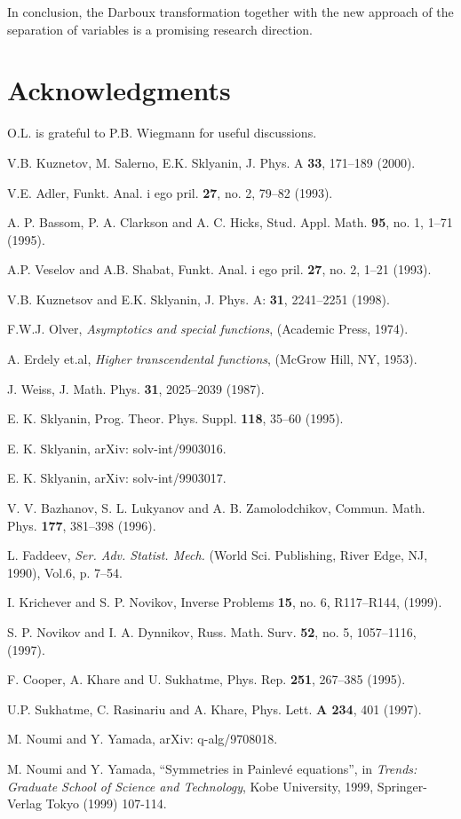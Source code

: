 \documentclass[a4paper,11pt]{article}
\begin{document}
In conclusion, the Darboux transformation together with the new approach of
the separation of variables is a promising research direction.

\section*{Acknowledgments}
\noindent
O.L. is grateful to P.B. Wiegmann for useful discussions.


\begin{thebibliography}{99}

V.B. Kuznetov, M. Salerno, E.K. Sklyanin,
    J. Phys. A {\bf 33}, 171--189 (2000).

V.E. Adler,
    Funkt. Anal. i ego pril. {\bf 27}, no. 2, 79--82 (1993).

A. P. Bassom, P. A. Clarkson and A. C. Hicks,
    Stud. Appl. Math. {\bf 95}, no. 1, 1--71 (1995).

A.P. Veselov and A.B. Shabat,
    Funkt. Anal. i ego pril. {\bf 27}, no. 2, 1--21 (1993).

V.B. Kuznetsov and E.K. Sklyanin,
    J. Phys. A: {\bf 31}, 2241--2251 (1998).

F.W.J. Olver,
    {\it Asymptotics and special functions}, (Academic Press, 1974).

A. Erdely et.al,
    {\it Higher transcendental functions}, (McGrow Hill, NY, 1953).

J. Weiss,
    J. Math. Phys. {\bf 31}, 2025--2039 (1987).

E. K. Sklyanin,
    Prog. Theor. Phys. Suppl. {\bf 118}, 35--60 (1995).

E. K. Sklyanin, arXiv: solv-int/9903016.

E. K. Sklyanin, arXiv: solv-int/9903017.

V. V. Bazhanov, S. L. Lukyanov and A. B. Zamolodchikov,
    Commun. Math. Phys. {\bf 177}, 381--398 (1996).

L. Faddeev,
    {\it Ser. Adv. Statist. Mech. } (World Sci. Publishing, River Edge, NJ, 1990),
    Vol.6, p. 7--54.

I. Krichever and S. P.  Novikov,
    Inverse Problems {\bf 15}, no. 6, R117--R144, (1999).

S. P. Novikov and I. A.  Dynnikov,
    Russ. Math. Surv. {\bf 52}, no. 5, 1057--1116, (1997).

F. Cooper, A. Khare and U. Sukhatme,
    Phys. Rep. {\bf 251}, 267--385 (1995).

U.P. Sukhatme, C. Rasinariu and A. Khare,
    Phys. Lett. {\bf A 234}, 401 (1997).

M. Noumi and Y. Yamada, arXiv: q-alg/9708018.

M. Noumi and Y. Yamada, ``Symmetries in Painlev\'{e} equations'', in
{\em Trends: Graduate School of Science and Technology}, Kobe University, 1999,
Springer-Verlag Tokyo (1999) 107-114.

\end{thebibliography}
\end{document}
